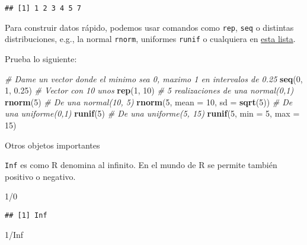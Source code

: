 \documentclass[]{article}
\newenvironment{Shaded}{\begin{snugshade}}{\end{snugshade}}
\newcommand{\KeywordTok}[1]{\textcolor[rgb]{0.13,0.29,0.53}{\textbf{{#1}}}}
\newcommand{\DataTypeTok}[1]{\textcolor[rgb]{0.13,0.29,0.53}{{#1}}}
\newcommand{\DecValTok}[1]{\textcolor[rgb]{0.00,0.00,0.81}{{#1}}}
\newcommand{\FloatTok}[1]{\textcolor[rgb]{0.00,0.00,0.81}{{#1}}}
\newcommand{\CommentTok}[1]{\textcolor[rgb]{0.56,0.35,0.01}{\textit{{#1}}}}
\newcommand{\OtherTok}[1]{\textcolor[rgb]{0.56,0.35,0.01}{{#1}}}
\newcommand{\NormalTok}[1]{{#1}}
\begin{document}
\begin{verbatim}
## [1] 1 2 3 4 5 7
\end{verbatim}

Para construir datos rápido, podemos usar comandos como \texttt{rep},
\texttt{seq} o distintas distribuciones, e.g., la normal \texttt{rnorm},
uniformes \texttt{runif} o cualquiera en
\href{https://stat.ethz.ch/R-manual/R-devel/library/stats/html/Distributions.html}{esta
lista}.

Prueba lo siguiente:

\begin{Shaded}
\begin{Highlighting}[]
\CommentTok{# Dame un vector donde el minimo sea 0, maximo 1 en intervalos de 0.25}
\KeywordTok{seq}\NormalTok{(}\DecValTok{0}\NormalTok{, }\DecValTok{1}\NormalTok{, }\FloatTok{0.25}\NormalTok{)}
\CommentTok{# Vector con 10 unos}
\KeywordTok{rep}\NormalTok{(}\DecValTok{1}\NormalTok{, }\DecValTok{10}\NormalTok{)}
\CommentTok{# 5 realizaciones de una normal(0,1)}
\KeywordTok{rnorm}\NormalTok{(}\DecValTok{5}\NormalTok{)}
\CommentTok{# De una normal(10, 5)}
\KeywordTok{rnorm}\NormalTok{(}\DecValTok{5}\NormalTok{, }\DataTypeTok{mean =} \DecValTok{10}\NormalTok{, }\DataTypeTok{sd =} \KeywordTok{sqrt}\NormalTok{(}\DecValTok{5}\NormalTok{))}
\CommentTok{# De una uniforme(0,1)}
\KeywordTok{runif}\NormalTok{(}\DecValTok{5}\NormalTok{)}
\CommentTok{# De una uniforme(5, 15)}
\KeywordTok{runif}\NormalTok{(}\DecValTok{5}\NormalTok{, }\DataTypeTok{min =} \DecValTok{5}\NormalTok{, }\DataTypeTok{max =} \DecValTok{15}\NormalTok{)}
\end{Highlighting}
\end{Shaded}

Otros objetos importantes

\texttt{Inf} es como R denomina al infinito. En el mundo de R se permite
también positivo o negativo.

\begin{Shaded}
\begin{Highlighting}[]
\DecValTok{1}\NormalTok{/}\DecValTok{0}
\end{Highlighting}
\end{Shaded}

\begin{verbatim}
## [1] Inf
\end{verbatim}

\begin{Shaded}
\begin{Highlighting}[]
\DecValTok{1}\NormalTok{/}\OtherTok{Inf}
\end{Highlighting}
\end{Shaded}
\end{document}
